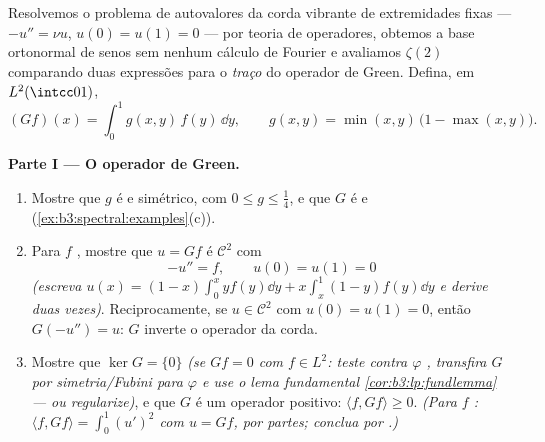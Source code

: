 \begin{problem}\label{pb:b3:spectral:1}
Resolvemos o problema de autovalores da corda vibrante de extremidades
fixas --- $-u'' = \nu u$, $u(0) = u(1) = 0$ --- por teoria de operadores, obtemos a base
ortonormal de senos sem nenhum cálculo de Fourier e avaliamos $\zeta(2)$
comparando duas expressões para o \emph{traço} do operador de Green.
Defina, em $L^2(\intcc01)$,
\[
(Gf)(x) = \int_0^1 g(x,y)\,f(y)\,\dd y,
\qquad
g(x, y) = \min(x,y)\,\bigl(1 - \max(x,y)\bigr).
\]

\medskip
\noindent\textbf{Parte I --- O operador de Green.}
\begin{enumerate}
  \item Mostre que $g$ é  e simétrico, com $0 \leq g
        \leq \frac14$, e que
        $G$ é  e  (\cref{ex:b3:spectral:examples}(c)).
  \item Para $f$ , mostre que $u = Gf$ é $\mathcal
        C^2$ com
        \[
        -u'' = f, \qquad u(0) = u(1) = 0
        \]
        \emph{(escreva $u(x) = (1-x)\int_0^xyf(y)\dd y +
        x\int_x^1(1-y)f(y)\dd y$ e derive duas vezes)}. Reciprocamente, se
        $u \in \mathcal C^2$ com $u(0) = u(1)
        = 0$, então $G(-u'') = u$: $G$ inverte o operador da
        corda.
  \item Mostre que $\ker G = \{0\}$ \emph{(se $Gf = 0$ com $f \in
        L^2$: teste contra
        $\varphi$ , transfira $G$ por simetria/Fubini para
        $\varphi$ e use o lema fundamental \cref{cor:b3:lp:fundlemma} --- ou
        regularize)}, e que $G$ é um operador positivo: $\langle f, Gf\rangle \geq 0$.
        \emph{(Para $f$ : $\langle f, Gf\rangle = \int_0^1 (u')^2$ com $u
        = Gf$, por partes;
        conclua por .)}
\end{enumerate}


\end{problem}
